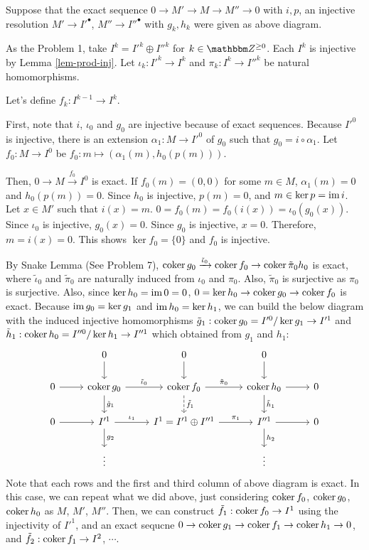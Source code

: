 Suppose that the exact sequence \(0 \to M' \to M \to M'' \to 0\) with \(i, p\), 
an injective resolution \(M' \to I'^\bullet\), \(M'' \to I''^\bullet\) with \(g_k, h_k\)
were given as above diagram.

As the Problem 1, take \(I^k = I'^k \oplus I''^k\) for \(k \in \bbZ^{\ge 0}\).
Each \(I^k\) is injective by Lemma \ref{lem-prod-inj}.
Let \(\iota_k: I'^k \to I^k\) and \(\pi_k: I^k \to I''^k\) be natural homomorphisms.

Let's define \(f_k: I^{k - 1} \to I^k\).

First,
note that \(i\), \(\iota_0\) and \(g_0\) are injective because of exact sequences.
Because \(I'^0\) is injective, there is an extension \(\alpha_1: M \to I'^0\) of \(g_0\) such that \(g_0 = i \circ \alpha_1\).
Let \(f_0: M \to I^0\) be \(f_0: m \mapsto (\alpha_1(m), h_0(p(m)))\).

Then, \(0 \to M \xrightarrow{f_0} I^0\) is exact.
If \(f_0(m) = (0, 0)\) for some \(m \in M\),
\(\alpha_1(m) = 0\) and \(h_0(p(m)) = 0\).
Since \(h_0\) is injective, \(p(m) = 0\), and \(m \in \ker p = \textnormal{im}\, i\).
Let \(x \in M'\) such that \(i(x) = m\).
\(0 = f_0(m) = f_0(i(x)) = \iota_0(g_0(x))\).
Since \(\iota_0\) is injective, \(g_0(x) = 0\).
Since \(g_0\) is injective, \(x = 0\).
Therefore, \(m = i(x) = 0\).
This shows \(\ker f_0 = \{0\}\) and \(f_0\) is injective.

By Snake Lemma (See Problem 7), \(\textnormal{coker}\, g_0 \xrightarrow{\tilde \iota_0} \textnormal{coker}\, f_0 \to \textnormal{coker}\,{\tilde \pi_0} h_0\) is exact, where \(\tilde\iota_0\) and \(\tilde\pi_0\) are naturally induced from \(\iota_0\) and \(\pi_0\).
Also, \(\tilde\pi_0\) is surjective as \(\pi_0\) is surjective.
Also, since \(\ker h_0 = \textnormal{im}\, 0 = 0\), \(0 = \ker h_0 \to \textnormal{coker}\, g_0 \to \textnormal{coker}\, f_0\) is exact.
Because \(\textnormal{im}\, g_0 = \ker g_1\) and \(\textnormal{im}\, h_0 = \ker h_1\),
we can build the below diagram with the induced injective homomorphisms \(\tilde g_1: \textnormal{coker}\, g_0 = I'^0 / \ker g_1 \to I'^1\) and \(\tilde h_1: \textnormal{coker}\, h_0 = I''^0 / \ker h_1 \to I''^1\) which obtained from \(g_1\) and \(h_1\):
\[
\begin{tikzcd}
& 0 \ar{d} & 0 \ar{d} & 0 \ar{d} & \\
0 \ar{r} & \coker g_0 \ar["\tilde \iota_0"]{r} \ar["\tilde g_1"]{d} & \coker f_0 \ar["\tilde \pi_0"]{r} \ar[dashed, "\tilde f_1"]{d} & \coker h_0 \ar{r} \ar["\tilde h_1"]{d} & 0 \\
0 \ar{r} & I'^1 \ar["\iota_1"]{r} \ar["g_2"]{d} & I^1 = I'^1 \oplus I''^1 \ar["\pi_1"]{r}  & I''^1 \ar{r} \ar["h_2"]{d} & 0 \\
 & \vdots&  & \vdots &
\end{tikzcd}
\]
Note that each rows and the first and third column of above diagram is exact.
In this case, we can repeat what we did above,
just considering \(\textnormal{coker}\, f_0\), \(\textnormal{coker}\, g_0\), \(\textnormal{coker}\, h_0\) as \(M\), \(M'\), \(M''\).
Then, we can construct \(\tilde f_1: \textnormal{coker}\, f_0 \to I^1\) using the injectivity of \(I'^1\),
and an exact sequcne \(0 \to \textnormal{coker}\, g_1 \to \textnormal{coker}\, f_1 \to \textnormal{coker}\, h_1 \to 0\),
and \(\tilde f_2: \textnormal{coker}\, f_1 \to I^2\),
\(\cdots\).

